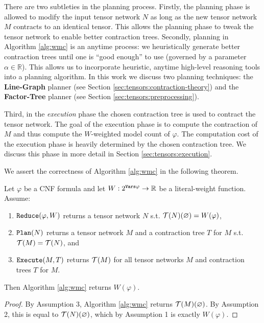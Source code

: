There are two subtleties in the planning process. 
Firstly, the planning phase is allowed to modify the input tensor network $N$ as long as the new tensor network $M$ contracts to an identical tensor. 
This allows the planning phase to tweak the tensor network to enable better contraction trees.
Secondly, planning in Algorithm \ref{alg:wmc} is an anytime process: we heuristically generate better contraction trees until one is ``good enough'' to use (governed by a parameter $\alpha \in \mathbb{R}$). 
This allows us to incorporate heuristic, anytime high-level reasoning tools into a planning algorithm. 
In this work we discuss two planning techniques: the \textbf{Line-Graph} planner (see Section \ref{sec:tensors:contraction-theory}) and the \textbf{Factor-Tree} planner (see Section \ref{sec:tensors:preprocessing}).

Third, in the \emph{execution} phase the chosen contraction tree is used to contract the tensor network.
The goal of the execution phase is to compute the contraction of $M$ and thus compute the $W$-weighted model count of $\varphi$. The computation cost of the execution phase is heavily determined by the chosen contraction tree. We discuss this phase in more detail in Section \ref{sec:tensors:execution}.

We assert the correctness of Algorithm \ref{alg:wmc} in the following theorem.
\begin{theorem}
\label{thm:alg-correctness}
Let $\varphi$ be a CNF formula and let $W: 2^{\texttt{\upshape Vars}{\varphi}} \rightarrow \mathbb{R}$ be a literal-weight function.
    Assume:
    \begin{enumerate}
        \item $\texttt{\upshape Reduce}(\varphi, W)$ returns a tensor network $N$ s.t. $\mathcal{T}(N)(\varnothing) = W(\varphi)$,
        \item $\texttt{\upshape Plan}(N)$ returns a tensor network $M$ and a contraction tree $T$ for $M$ s.t. $\mathcal{T}(M) = \mathcal{T}(N)$, and
        \item $\texttt{\upshape Execute}(M, T)$ returns $\mathcal{T}(M)$ for all tensor networks $M$ and contraction trees $T$ for $M$.
    \end{enumerate}
Then Algorithm \ref{alg:wmc} returns $W(\varphi)$.
\end{theorem}
\begin{proof}
By Assumption 3, Algorithm \ref{alg:wmc} returns $\mathcal{T}(M)(\varnothing)$. 
By Assumption 2, this is equal to $\mathcal{T}(N)(\varnothing)$, which by Assumption 1 is exactly $W(\varphi)$.
\end{proof}

